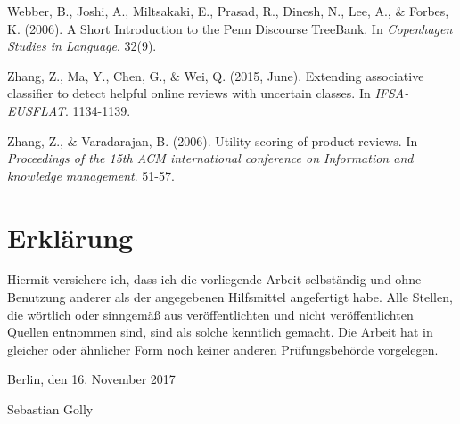 \documentclass[
    a4paper,%
    12pt,%
    oneside,%
    toc=bibliography,
    final,
]{scrartcl}
\begin{document}
\begin{thebibliography}{9}
 Webber, B., Joshi, A., Miltsakaki, E., Prasad, R., Dinesh, N., Lee, A., \& Forbes, K. (2006). A Short Introduction to the Penn Discourse TreeBank. In \textit{Copenhagen Studies in Language}, 32(9).

 Zhang, Z., Ma, Y., Chen, G., \& Wei, Q. (2015, June). Extending associative classifier to detect helpful online reviews with uncertain classes. In \textit{IFSA-EUSFLAT}. 1134-1139.

 Zhang, Z., \& Varadarajan, B. (2006). Utility scoring of product reviews. In \textit{Proceedings of the 15th ACM international conference on Information and knowledge management}. 51-57.

\end{thebibliography}


\pagebreak
{}

\vspace*{10em}
\section*{Erklärung}

\begin{sloppypar}
Hiermit versichere ich, dass ich die vorliegende Arbeit selbständig und ohne Benutzung anderer als der angegebenen Hilfsmittel angefertigt habe. Alle Stellen, die wörtlich oder sinngemäß aus veröffentlichten und nicht veröffentlichten Quellen entnommen sind, sind als solche kenntlich gemacht. Die Arbeit hat in gleicher oder ähnlicher Form noch keiner anderen Prüfungsbehörde vorgelegen.
\end{sloppypar}

\vspace{1em}

\begin{center}
Berlin, den 16. November 2017

\vspace{2.4em}

Sebastian Golly
\end{center}

\thispagestyle{empty}
\end{document}
